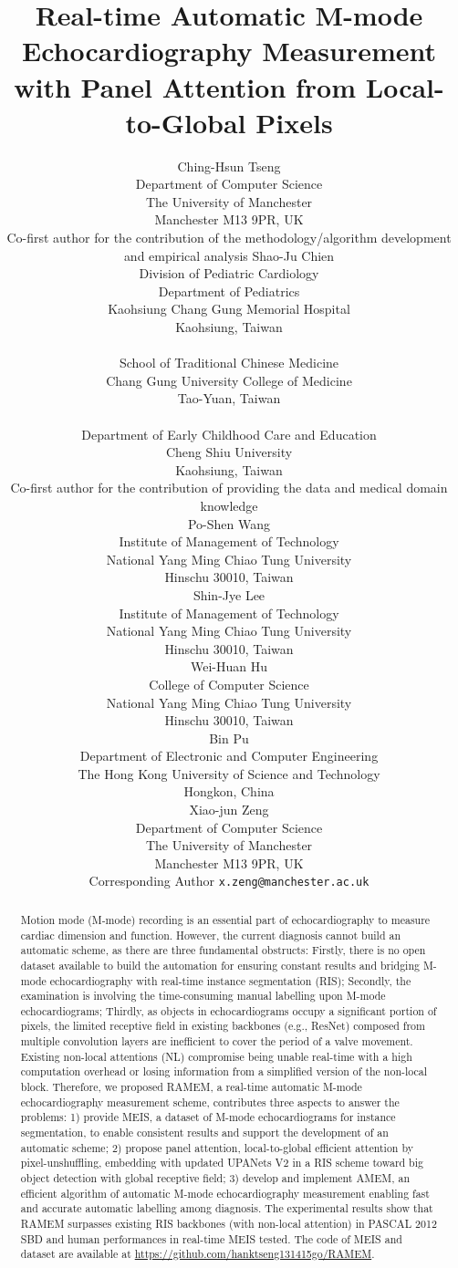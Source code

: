 \documentclass{article}
\title{Real-time Automatic M-mode Echocardiography Measurement with Panel Attention from Local-to-Global Pixels}
\author{
 Ching-Hsun Tseng \\
  Department of Computer Science\\
  The University of Manchester\\
  Manchester M13 9PR, UK\\
  \tiny Co-first author for the contribution of the methodology/algorithm development and empirical analysis
  \And
  Shao-Ju Chien \\
  Division of Pediatric Cardiology\\
  Department of Pediatrics\\
  Kaohsiung Chang Gung Memorial Hospital\\
  Kaohsiung, Taiwan\\
  \\
  School of Traditional Chinese Medicine\\
  Chang Gung University College of Medicine\\
  Tao-Yuan, Taiwan\\
  \\
  Department of Early Childhood Care and Education\\
  Cheng Shiu University\\
  Kaohsiung, Taiwan\\
  \tiny Co-first author for the contribution of providing the data and medical domain knowledge
  \\
  \And
  Po-Shen Wang \\
  Institute of Management of Technology\\
  National Yang Ming Chiao Tung University\\
  Hinschu 30010, Taiwan\\
  \And
  Shin-Jye Lee \\
  Institute of Management of Technology\\
  National Yang Ming Chiao Tung University\\
  Hinschu 30010, Taiwan\\
  \And
  Wei-Huan Hu \\
  College of Computer Science\\
  National Yang Ming Chiao Tung University\\
  Hinschu 30010, Taiwan\\
  \And
  Bin Pu \\
  Department of Electronic and Computer Engineering\\
  The Hong Kong University of Science and Technology\\
  Hongkon, China\\
  \And
  Xiao-jun Zeng \\
  Department of Computer Science\\
  The University of Manchester\\
  Manchester M13 9PR, UK\\
  \tiny Corresponding Author
  \texttt{x.zeng@manchester.ac.uk}
}
\begin{document}
\maketitle
\begin{abstract}
Motion mode (M-mode) recording is an essential part of echocardiography to measure cardiac dimension and function. However, the current diagnosis cannot build an automatic scheme, as there are three fundamental obstructs: Firstly, there is no open dataset available to build the automation for ensuring constant results and bridging M-mode echocardiography with real-time instance segmentation (RIS); Secondly, the examination is involving the time-consuming manual labelling upon M-mode echocardiograms; Thirdly, as objects in echocardiograms occupy a significant portion of pixels, the limited receptive field in existing backbones (e.g., ResNet) composed from multiple convolution layers are inefficient to cover the period of a valve movement. Existing non-local attentions (NL) compromise being unable real-time with a high computation overhead or losing information from a simplified version of the non-local block. Therefore, we proposed RAMEM, a real-time automatic M-mode echocardiography measurement scheme, contributes three aspects to answer the problems: 1) provide MEIS, a dataset of M-mode echocardiograms for instance segmentation, to enable consistent results and support the development of an automatic scheme; 2) propose panel attention, local-to-global efficient attention by pixel-unshuffling, embedding with updated UPANets V2 in a RIS scheme toward big object detection with global receptive field; 3) develop and implement AMEM, an efficient algorithm of automatic M-mode echocardiography measurement enabling fast and accurate automatic labelling among diagnosis. The experimental results show that RAMEM surpasses existing RIS backbones (with non-local attention) in PASCAL 2012 SBD and human performances in real-time MEIS tested. The code of MEIS and dataset are available at \url{https://github.com/hanktseng131415go/RAMEM}.
\end{abstract}

\end{document}
